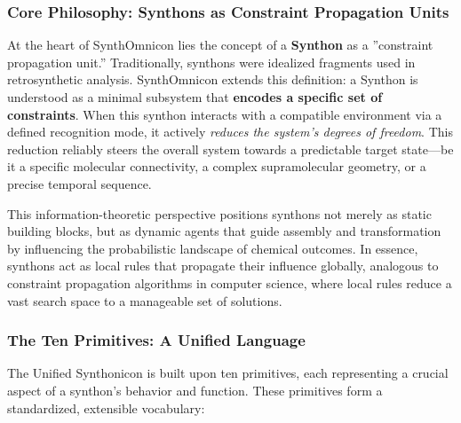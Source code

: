\documentclass[12pt,a4paper]{article}
\begin{document}
\subsubsection{Core Philosophy: Synthons as Constraint Propagation Units}

At the heart of SynthOmnicon lies the concept of a \textbf{Synthon} as a ''constraint propagation unit.'' Traditionally, synthons were idealized fragments used in retrosynthetic analysis. SynthOmnicon extends this definition: a Synthon is understood as a minimal subsystem that \textbf{encodes a specific set of constraints}. When this synthon interacts with a compatible environment via a defined recognition mode, it actively \emph{reduces the system's degrees of freedom}. This reduction reliably steers the overall system towards a predictable target state---be it a specific molecular connectivity, a complex supramolecular geometry, or a precise temporal sequence.

This information-theoretic perspective positions synthons not merely as static building blocks, but as dynamic agents that guide assembly and transformation by influencing the probabilistic landscape of chemical outcomes. In essence, synthons act as local rules that propagate their influence globally, analogous to constraint propagation algorithms in computer science, where local rules reduce a vast search space to a manageable set of solutions.

\subsubsection{The Ten Primitives: A Unified Language}

The Unified Synthonicon is built upon ten primitives, each representing a crucial aspect of a synthon's behavior and function. These primitives form a standardized, extensible vocabulary:
\end{document}

